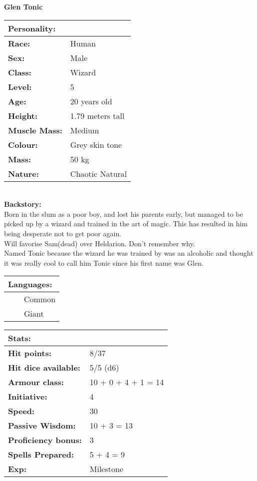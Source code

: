 \documentclass[11pt]{article}
\newcommand{\tabitem}{~~\llap{--}~~}
\begin{document}
	\begin{center}
\Huge \textbf{Glen Tonic}
	\end{center}
	\begin{multicols}{2}
\noindent \begin{tabularx}{95mm}{@{}l l}
\Large \textbf{Personality:} 	& 					\\
\hline
\textbf{Race:} 					& Human 			\\
\textbf{Sex:} 					& Male 				\\
\textbf{Class:}					& Wizard			\\
\textbf{Level:} 				& 5 	 			\\
\textbf{Age:} 					& 20 years old 		\\
\textbf{Height:} 				& 1.79 meters tall 	\\
\textbf{Muscle Mass:} 			& Medium 			\\
\textbf{Colour:} 				& Grey skin tone 	\\
\textbf{Mass:} 					& 50 kg 			\\
\textbf{Nature:} 				& Chaotic Natural
		\end{tabularx} \\
\textbf{Backstory:} \\
Born in the slum as a poor boy, and lost his parents early, but managed to be picked up by a wizard and trained in the art of magic. This has resulted in him being desperate not to get poor again. \\
Will favorise Sam(dead) over Heldarion. Don't remember why. \\
Named Tonic because the wizard he was trained by was an alcoholic and thought it was really cool to call him Tonic since his first name was Glen. \\

\noindent \begin{tabularx}{95mm}{@{}l}
{\Large \textbf{Languages:}} \\
\hline
\tabitem Common \\
\tabitem Giant
		\end{tabularx}
		
\vspace{4mm}
		
\noindent \begin{tabularx}{95mm}{@{}l l}
\Large \textbf{Stats:}		 	& 							\\
\hline
\textbf{Hit points:} 			& 8/37					 	\\
\textbf{Hit dice available:}	& 5/5 (d6)					\\
\textbf{Armour class:} 			& 10 + 0 + 4 + 1 = 14 		\\
\textbf{Initiative:} 			& 4	 						\\
\textbf{Speed:} 				& 30		 				\\
\textbf{Passive Wisdom:} 		& 10 + 3 = 13	 			\\
\textbf{Proficiency bonus:}		& 3							\\
\textbf{Spells Prepared:} 		& 5 + 4 = 9		 			\\
\textbf{Exp:} 					& Milestone
		\end{tabularx}
		

\end{multicols}
\end{document}
